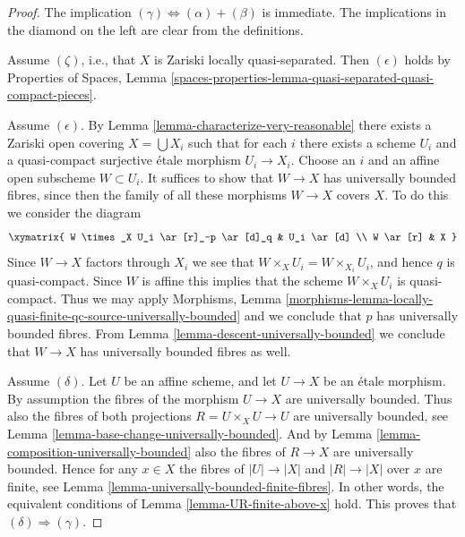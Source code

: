 \begin{proof}
The implication $(\gamma) \Leftrightarrow (\alpha) + (\beta)$ is immediate.
The implications in the diamond on the left are clear from the
definitions.

\medskip\noindent
Assume $(\zeta)$, i.e., that $X$ is Zariski locally quasi-separated.
Then $(\epsilon)$ holds by
Properties of Spaces, Lemma
\ref{spaces-properties-lemma-quasi-separated-quasi-compact-pieces}.

\medskip\noindent
Assume $(\epsilon)$. By
Lemma \ref{lemma-characterize-very-reasonable}
there exists
a Zariski open covering $X = \bigcup X_i$ such that for each $i$
there exists a scheme $U_i$ and a quasi-compact surjective \'etale morphism
$U_i \to X_i$. Choose an $i$ and an affine open subscheme $W \subset U_i$.
It suffices to show that $W \to X$ has universally bounded fibres, since then
the family of all these morphisms $W \to X$ covers $X$.
To do this we consider the diagram
$$
\xymatrix{
W \times_X U_i \ar[r]_-p \ar[d]_q & U_i \ar[d] \\
W \ar[r] & X
}
$$
Since $W \to X$ factors through $X_i$ we see that
$W \times_X U_i = W \times_{X_i} U_i$, and hence $q$ is quasi-compact.
Since $W$ is affine this implies that the scheme $W \times_X U_i$
is quasi-compact. Thus we may apply
Morphisms, Lemma
\ref{morphisms-lemma-locally-quasi-finite-qc-source-universally-bounded}
and we conclude that $p$ has universally bounded fibres. From
Lemma \ref{lemma-descent-universally-bounded}
we conclude that $W \to X$ has universally bounded fibres as well.

\medskip\noindent
Assume $(\delta)$. Let $U$ be an affine scheme, and let $U \to X$ be an \'etale
morphism. By assumption the fibres of the morphism $U \to X$ are universally
bounded. Thus also the fibres of both projections $R = U \times_X U \to U$
are universally bounded, see
Lemma \ref{lemma-base-change-universally-bounded}.
And by
Lemma \ref{lemma-composition-universally-bounded}
also the fibres of $R \to X$ are universally bounded.
Hence for any $x \in X$ the fibres of $|U| \to |X|$ and $|R| \to |X|$
over $x$ are finite, see
Lemma \ref{lemma-universally-bounded-finite-fibres}.
In other words, the equivalent conditions of
Lemma \ref{lemma-UR-finite-above-x}
hold. This proves that $(\delta) \Rightarrow (\gamma)$.
\end{proof}
